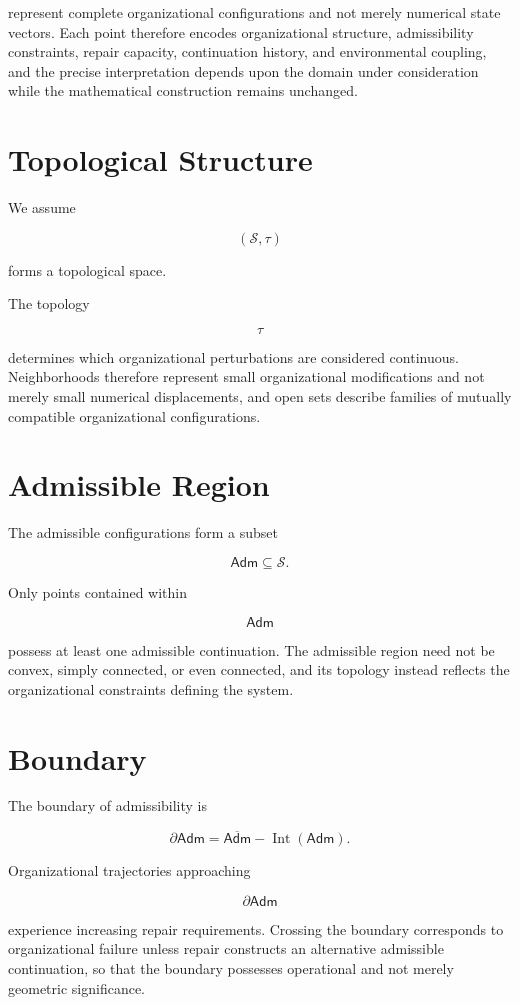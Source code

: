 \documentclass[11pt,oneside]{book}
\numberwithin{equation}{chapter}
\theoremstyle{definition}
\theoremstyle{plain}
\newcommand{\Adm}{\mathsf{Adm}}
\begin{document}
represent complete organizational configurations and not merely numerical state vectors. Each point therefore encodes organizational structure, admissibility constraints, repair capacity, continuation history, and environmental coupling, and the precise interpretation depends upon the domain under consideration while the mathematical construction remains unchanged.

\section{Topological Structure}

We assume

\[
(\mathcal S,\tau)
\]

forms a topological space.

The topology

\[
\tau
\]

determines which organizational perturbations are considered continuous. Neighborhoods therefore represent small organizational modifications and not merely small numerical displacements, and open sets describe families of mutually compatible organizational configurations.

\section{Admissible Region}

The admissible configurations form a subset

\[
\Adm
\subseteq
\mathcal S.
\]

Only points contained within

\[
\Adm
\]

possess at least one admissible continuation. The admissible region need not be convex, simply connected, or even connected, and its topology instead reflects the organizational constraints defining the system.

\section{Boundary}

The boundary of admissibility is

\[
\partial
\Adm
=
\overline{\Adm}
-
\operatorname{Int}
(\Adm).
\]

Organizational trajectories approaching

\[
\partial
\Adm
\]

experience increasing repair requirements. Crossing the boundary corresponds to organizational failure unless repair constructs an alternative admissible continuation, so that the boundary possesses operational and not merely geometric significance.
\end{document}
